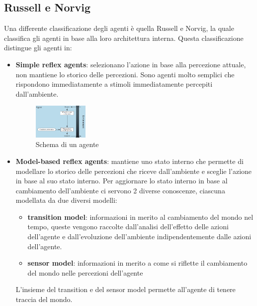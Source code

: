 \subsection{Russell e Norvig}
Una differente classificazione degli agenti è quella Russell e Norvig, la quale
classifica gli agenti in base alla loro architettura interna. Questa classificazione
distingue gli agenti in:
\begin{itemize}
    \item \textbf{Simple reflex agents}: selezionano l'azione in base alla percezione
          attuale, non mantiene lo storico delle percezioni. Sono agenti molto semplici
          che rispondono immediatamente a stimoli immediatamente percepiti dall'ambiente.
          \begin{figure}[!h]
              \centering
              \includegraphics[width=0.25\textwidth]{./img/Agenti/SimpleReflexAgents.png}
              \caption{Schema di un agente}
              \label{fig:simpleReflex}
          \end{figure}
    \item \textbf{Model-based reflex agents}: mantiene uno stato interno che permette
          di modellare lo storico delle percezioni che riceve dall'ambiente e sceglie
          l'azione in base al suo stato interno. Per aggiornare lo stato interno
          in base al cambiamento dell'ambiente ci servono 2 diverse conoscenze, ciascuna
          modellata da due diversi modelli:
          \begin{itemize}
              \item \textbf{transition model}: informazioni in merito
                    al cambiamento del mondo nel tempo, queste vengono raccolte dall'analisi
                    dell'effetto delle azioni dell'agente e dall'evoluzione dell'ambiente
                    indipendentemente dalle azioni dell'agente.
              \item \textbf{sensor model}: informazioni in merito
                    a come si riflette il cambiamento del mondo nelle percezioni dell'agente
          \end{itemize}
          L'insieme del transition e del sensor model permette all'agente di tenere
          traccia del mondo.
          \begin{figure}[!h]

\end{figure}
\end{itemize}
